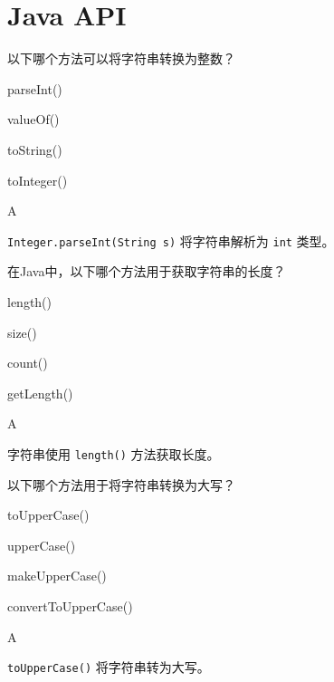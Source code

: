 \section{Java API}

\begin{question}
	以下哪个方法可以将字符串转换为整数？
	\begin{options}
		\item parseInt()
		\item valueOf()
		\item toString()
		\item toInteger()
	\end{options}
	\begin{answer}
		A
	\end{answer}
	\begin{explanation}
		\texttt{Integer.parseInt(String s)} 将字符串解析为 \texttt{int} 类型。
	\end{explanation}
\end{question}

\begin{question}
	在Java中，以下哪个方法用于获取字符串的长度？
	\begin{options}
		\item length()
		\item size()
		\item count()
		\item getLength()
	\end{options}
	\begin{answer}
		A
	\end{answer}
	\begin{explanation}
		字符串使用 \texttt{length()} 方法获取长度。
	\end{explanation}
\end{question}

\begin{question}
	以下哪个方法用于将字符串转换为大写？
	\begin{options}
		\item toUpperCase()
		\item upperCase()
		\item makeUpperCase()
		\item convertToUpperCase()
	\end{options}
	\begin{answer}
		A
	\end{answer}
	\begin{explanation}
		\texttt{toUpperCase()} 将字符串转为大写。
	\end{explanation}
\end{question}

